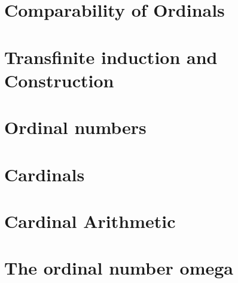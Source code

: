 \section{Comparability of Ordinals}

\section{Transfinite induction and Construction}

\section{Ordinal numbers}

\section{Cardinals}

\section{Cardinal Arithmetic}

\section{The ordinal number omega}
